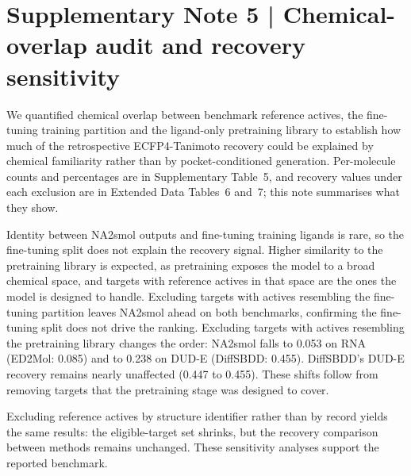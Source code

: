 \section*{Supplementary Note 5 | Chemical-overlap audit and recovery sensitivity}

We quantified chemical overlap between benchmark reference actives, the fine-tuning training partition and the ligand-only pretraining library to establish how much of the retrospective ECFP4-Tanimoto recovery could be explained by chemical familiarity rather than by pocket-conditioned generation. Per-molecule counts and percentages are in Supplementary Table~5, and recovery values under each exclusion are in Extended Data Tables~6 and~7; this note summarises what they show.

Identity between NA2smol outputs and fine-tuning training ligands is rare, so the fine-tuning split does not explain the recovery signal. Higher similarity to the pretraining library is expected, as pretraining exposes the model to a broad chemical space, and targets with reference actives in that space are the ones the model is designed to handle. Excluding targets with actives resembling the fine-tuning partition leaves NA2smol ahead on both benchmarks, confirming the fine-tuning split does not drive the ranking. Excluding targets with actives resembling the pretraining library changes the order: NA2smol falls to 0.053 on RNA (ED2Mol: 0.085) and to 0.238 on DUD-E (DiffSBDD: 0.455). DiffSBDD's DUD-E recovery remains nearly unaffected (0.447 to 0.455). These shifts follow from removing targets that the pretraining stage was designed to cover.

Excluding reference actives by structure identifier rather than by record yields the same results: the eligible-target set shrinks, but the recovery comparison between methods remains unchanged. These sensitivity analyses support the reported benchmark.
